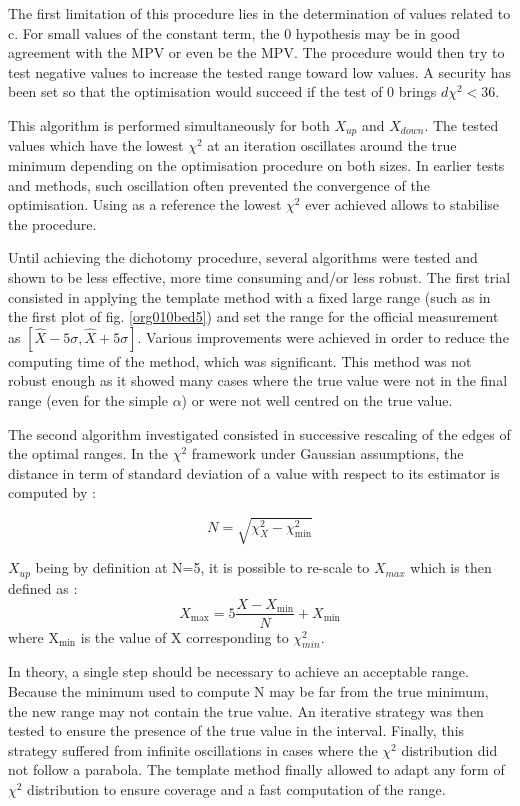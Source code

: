 The first limitation of this procedure lies in the determination of values related to c.
For small values of the constant term, the 0 hypothesis may be in good agreement with the MPV or even be the MPV.
The procedure would then try to test negative values to increase the tested range toward low values.
A security has been set so that the optimisation would succeed if the test of 0 brings $d\chi^2<36$.

This algorithm is performed simultaneously for both $X_{up}$ and $X_{down}$.
The tested values which have the lowest $\chi^2$ at an iteration oscillates around the true minimum depending on the optimisation procedure on both sizes.
In earlier tests and methods, such oscillation often prevented the convergence of the optimisation.
Using as a reference the lowest $\chi^2$ ever achieved allows to stabilise the procedure.

Until achieving the dichotomy procedure, several algorithms were tested and shown to be less effective, more time consuming and/or less robust.
The first trial consisted in applying the template method with a fixed large range (such as in the first plot of fig. \ref{org010bed5}) and set the range for the official measurement as \([\hat{X}- 5\sigma, \hat{X}+ 5\sigma]\).
Various improvements were achieved in order to reduce the computing time of the method, which was significant.
This method was not robust enough as it showed many cases where the true value were not in the final range (even for the simple $\alpha$) or were not well centred on the true value.

The second algorithm investigated consisted in successive rescaling of the edges of the optimal ranges.
In the $\chi^2$ framework under Gaussian assumptions, the distance in term of standard deviation of a value with respect to its estimator is computed by :

\begin{equation}
N = \sqrt{\chi^2_{X}-\chi^2_\text{min}}
\end{equation}

$X_{up}$ being by definition at N=5, it is possible to re-scale to $X_{max}$ which is then defined as :
\begin{equation}
X_\text{max} = 5\frac{X-X_\text{min}}{N} + X_\text{min}
\end{equation}
where X\(_{\text{min}}\) is the value of X corresponding to $\chi^2_{min}$.

In theory, a single step should be necessary to achieve an acceptable range.
Because the minimum used to compute N may be far from the true minimum, the new range may not contain the true value.
An iterative strategy was then tested to ensure the presence of the true value in the interval.
Finally, this strategy suffered from infinite oscillations in cases where the $\chi^2$ distribution did not follow a parabola.
The template method finally allowed to adapt any form of $\chi^2$ distribution to ensure coverage and a fast computation of the range.


